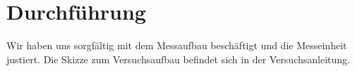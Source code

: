 \section{Durchführung}
\label{sec:durchfuehrung}

Wir haben uns sorgfältig mit dem Messaufbau beschäftigt und die Messeinheit justiert. Die Skizze zum Versuchsaufbau befindet sich in der Versuchsanleitung.
